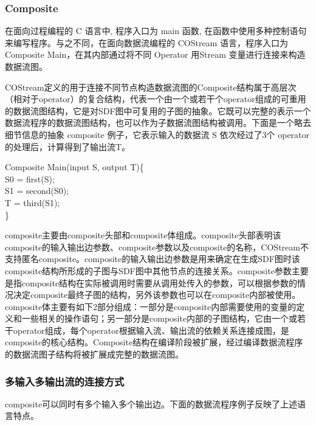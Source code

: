 \subsubsection{Composite}
在面向过程编程的 C 语言中, 程序入口为 main 函数, 在函数中使用多种控制语句来编写程序。与之不同，在面向数据流编程的 COStream 语言，程序入口为 Composite Main，在其内部通过将不同 Operator 用Stream 变量进行连接来构造数据流图。

COStream定义的用于连接不同节点构造数据流图的Composite结构属于高层次（相对于operator）的复合结构，代表一个由一个或若干个operator组成的可重用的数据流图结构，它是对SDF图中可复用的子图的抽象。它既可以完整的表示一个数据流程序的数据流图结构，也可以作为子数据流图结构被调用。下面是一个略去细节信息的抽象 composite 例子，它表示输入的数据流 S 依次经过了3个 operator 的处理后，计算得到了输出流T。

\begin{algorithm}\label{algo:operator}
Composite Main(input S, output T)\{\\
 \hspace*{1 pc} S0 = first(S);\\
 \hspace*{1 pc} S1 = second(S0);\\
 \hspace*{1 pc} T  = third(S1);\\
\}
\end{algorithm}

composite主要由composite头部和composite体组成。composite头部表明该composite的输入输出边参数、composite参数以及composite的名称，COStream不支持匿名composite。composite的输入输出边参数是用来确定在生成SDF图时该composite结构所形成的子图与SDF图中其他节点的连接关系。composite参数主要是指composite结构在实际被调用时需要从调用处传入的参数，可以根据参数的情况决定composite最终子图的结构，另外该参数也可以在composite内部被使用。composite体主要有如下2部分组成：一部分是composite内部需要使用的变量的定义和一些相关的操作语句；另一部分是composite内部的子图结构，它由一个或若干operator组成，每个operator根据输入流、输出流的依赖关系连接成图，是composite的核心结构。Composite结构在编译阶段被扩展，经过编译数据流程序的数据流图子结构将被扩展成完整的数据流图。

\subsubsection{多输入多输出流的连接方式}

composite可以同时有多个输入多个输出边。下面的数据流程序例子反映了上述语言特点。

